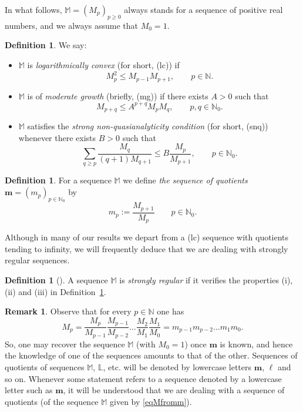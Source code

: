 \documentclass[11pt,a4paper]{article}
\theoremstyle{definition}
\newtheorem{defi}[theo]{Definition}
\newtheorem{rema}[theo]{Remark}
\def\bl{\boldsymbol{\ell}}
\def\N{\mathbb{N}}
\def\M{\mathbb{M}}
\def\bM{\mathbb{M}}%
\def\L{\mathbb{L}} %
\def\m{\boldsymbol{m}}
\def\bm{\boldsymbol{m}}
\begin{document}
In what follows, $\M=(M_p)_{p\geq 0}$ always stands for
a sequence of positive real numbers, and we always assume that $M_0=1$.

\begin{defi}\label{defPropertiesSequences}
We say:
\begin{itemize}
\item[(i)]  $\M$ is \textit{logarithmically convex} (for short, (lc)) if
$$M_{p}^{2}\le M_{p-1}M_{p+1},\qquad p\in\N.
$$

\item[(ii)]  $\M$ is of \textit{moderate growth} (briefly, (mg)) if there exists $A>0$ such that
$$M_{p+q}\le A^{p+q}M_{p}M_{q},\qquad p,q\in\N_0.$$

\item[(iii)]  $\bM$ satisfies the \textit{strong non-quasianalyticity condition} (for short, (snq)) whenever there exists $B>0$ such that
$$
\sum_{q\ge p}\frac{M_{q}}{(q+1)M_{q+1}}\le B\frac{M_{p}}{M_{p+1}},\qquad p\in\N_0.
$$
\end{itemize}
\end{defi}


\begin{defi} For a sequence $\M$ we define {\it the sequence of quotients} $\m=(m_p)_{p\in\N_0}$ by $$m_p:=\frac{M_{p+1}}{M_p} \qquad p\in \N_0.$$
\end{defi}

Although in many of our results we depart from a (lc) sequence with quotients tending to infinity, we will frequently deduce that we are dealing with strongly regular sequences.

\begin{defi}[\cite{thilliez}]
A sequence $\M$ is {\it strongly regular} if it verifies the properties (i), (ii) and (iii) in Definition~\ref{defPropertiesSequences}.
\end{defi}

\begin{rema}\label{remaequivMm}
Observe that for every $p\in\N$ one has
\begin{equation}\label{eqMfromm}
M_p=\frac{M_p}{M_{p-1}}\frac{M_{p-1}}{M_{p-2}}\dots\frac{M_2}{M_{1}}\frac{M_1}{M_{0}}= m_{p-1}m_{p-2}\dots m_1m_0.
\end{equation}
So, one may recover the sequence $\M$ (with $M_0=1$) once $\bm$ is known, and hence the knowledge of one of the sequences amounts to that of the other.
Sequences of quotients of sequences $\M$, $\L$, etc. will be denoted by lowercase letters $\bm$, $\bl$ and so on. Whenever some statement
refers to a sequence denoted by a lowercase letter such as $\bm$, it will be understood that we are dealing with a sequence of quotients (of the sequence $\M$ given by \eqref{eqMfromm}).
\end{rema}
\end{document}
